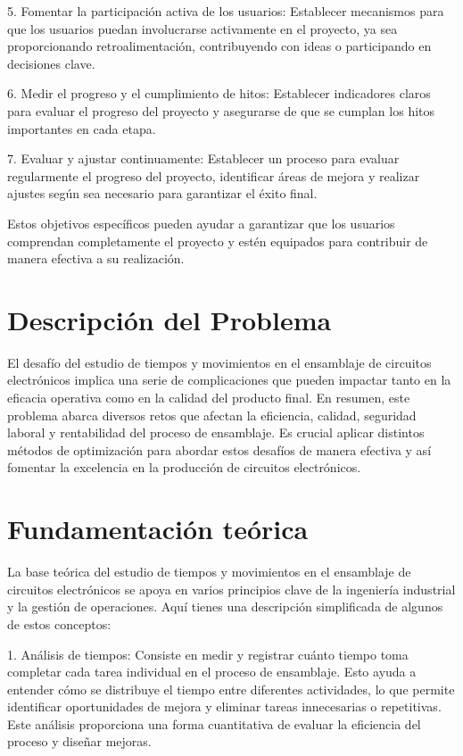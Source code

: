     5. Fomentar la participación activa de los usuarios: Establecer mecanismos para que los usuarios puedan involucrarse activamente en el proyecto, ya sea proporcionando retroalimentación, contribuyendo con ideas o participando en decisiones clave. 
    \newline
    
    6. Medir el progreso y el cumplimiento de hitos: Establecer indicadores claros para evaluar el progreso del proyecto y asegurarse de que se cumplan los hitos importantes en cada etapa. 
    \newline
    
    7. Evaluar y ajustar continuamente: Establecer un proceso para evaluar regularmente el progreso del proyecto, identificar áreas de mejora y realizar ajustes según sea necesario para garantizar el éxito final. \newline
    
    Estos objetivos específicos pueden ayudar a garantizar que los usuarios comprendan completamente el proyecto y estén equipados para contribuir de manera efectiva a su realización.
    
    \section{Descripción del Problema }
    El desafío del estudio de tiempos y movimientos en el ensamblaje de circuitos electrónicos implica una serie de complicaciones que pueden impactar tanto en la eficacia operativa como en la calidad del producto final. En resumen, este problema abarca diversos retos que afectan la eficiencia, calidad, seguridad laboral y rentabilidad del proceso de ensamblaje. Es crucial aplicar distintos métodos de optimización para abordar estos desafíos de manera efectiva y así fomentar la excelencia en la producción de circuitos electrónicos.
    
    \section{  Fundamentación teórica  }
    La base teórica del estudio de tiempos y movimientos en el ensamblaje de circuitos electrónicos se apoya en varios principios clave de la ingeniería industrial y la gestión de operaciones. Aquí tienes una descripción simplificada de algunos de estos conceptos:
    \newline
    
    1. Análisis de tiempos: Consiste en medir y registrar cuánto tiempo toma completar cada tarea individual en el proceso de ensamblaje. Esto ayuda a entender cómo se distribuye el tiempo entre diferentes actividades, lo que permite identificar oportunidades de mejora y eliminar tareas innecesarias o repetitivas. Este análisis proporciona una forma cuantitativa de evaluar la eficiencia del proceso y diseñar mejoras.
    \newline
    

